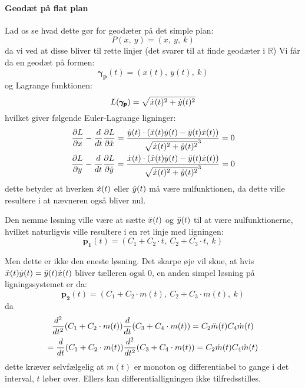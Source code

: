 \paragraph{Geodæt på flat plan}
Lad os se hvad dette gør for geodæter på det simple plan:
\begin{equation}\label{eq:P}
P(x,~y) = (x,~y,~k)
\end{equation}
da vi ved at disse bliver til rette linjer (det svarer til at finde geodæter i \(\mathbb{R}\))
%
Vi får da en geodæt på formen:
\begin{equation*}
\pmb{\gamma_p}(t) = (x(t),~y(t),~k)
\end{equation*}
%
og Lagrange funktionen:
\begin{equation*}
L(\pmb{\gamma_p}) = \sqrt{ \dot{x}(t)^2 + \dot{y}(t)^2 }
\end{equation*}
%
hvilket giver følgende Euler-Lagrange ligninger:
\begin{equation*}
\begin{gathered}
\frac{\partial L}{\partial x} - \frac{d}{d t} \frac{\partial L}{\partial \dot{x}} =
\frac{\dot{y}(t) \cdot ( \ddot{x}(t)\dot{y}(t) - \ddot{y}(t)\dot{x}(t) )}{\sqrt{\dot{x}(t)^2 + \dot{y}(t)^2}^3} = 0\\
\frac{\partial L}{\partial y} - \frac{d}{d t} \frac{\partial L}{\partial \dot{y}} =
\frac{\dot{x}(t) \cdot ( \ddot{x}(t)\dot{y}(t) - \ddot{y}(t)\dot{x}(t) )}{\sqrt{\dot{x}(t)^2 + \dot{y}(t)^2}^3} = 0\\
\end{gathered}
\end{equation*}
%
dette betyder at hverken  \( \dot{x}(t) \) eller \(\dot{y}(t) \) må være nulfunktionen,
da dette ville resultere i at nævneren også bliver nul.

Den nemme løsning ville være at sætte \(\ddot{x}(t)\) og \(\ddot{y}(t)\) til at være nulfunktionerne,
hvilket naturligvis ville resultere i en ret linje med ligningen:
\begin{equation*}
\pmb{p_1}(t) = (C_1 + C_2\cdot t,~C_2 + C_3\cdot t,~k)
\end{equation*}

Men dette er ikke den eneste løsning. Det skarpe øje vil skue, at hvis
\( \ddot{x}(t)\dot{y}(t) = \ddot{y}(t)\dot{x}(t) \)
bliver tælleren også \(0\), en anden simpel løsning på ligningssystemet er da:
\begin{equation*}
\pmb{p_2}(t) = (C_1 + C_2\cdot m(t),~C_2 + C_3\cdot m(t),~k)
\end{equation*}
da
\begin{equation*}
\begin{gathered}
\frac{d^2}{dt^2} (C_1 + C_2\cdot m(t)) \frac{d}{dt} (C_3 + C_4\cdot m(t)) = C_2\ddot{m}(t) C_4\dot{m}(t) \\
 = \frac{d}{dt} (C_1 + C_2\cdot m(t)) \frac{d^2}{dt^2} (C_3 + C_4\cdot m(t)) = C_2\dot{m}(t) C_4\ddot{m}(t) 
\end{gathered}
\end{equation*}
dette kræver selvfælgelig at \( m(t) \) er monoton og differentiabel to gange i det interval, \(t\) løber over.
Ellers kan differentialligningen ikke tilfredsstilles.

